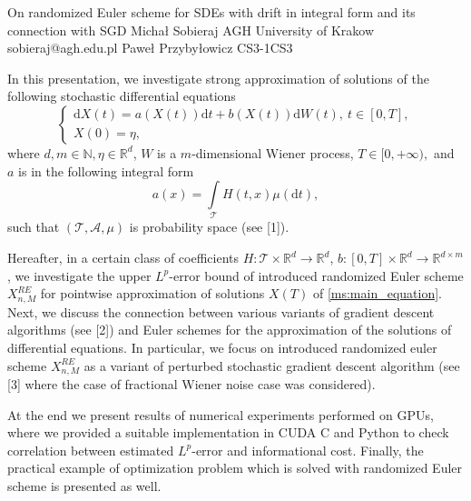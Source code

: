 \begin{talk}
  {On randomized Euler scheme for SDEs with drift in integral form and its connection with SGD}%
  {Micha{\l } Sobieraj}%
  {AGH University of Krakow}%
  {sobieraj@agh.edu.pl}%
  {Pawe{\l } Przyby{\l }owicz}%
{}{}{CS3-1}{CS3}

			
In this presentation, we investigate strong approximation of solutions of the following stochastic differential equations 
\begin{equation}
\label{ms:main_equation}
	\left\{ \begin{array}{ll}
	\displaystyle{
	\mathrm{d} X(t) = a(X(t))\mathrm{d} t + b(X(t)) \mathrm{d} W(t), \ t\in [0,T]},\\
	X(0)=\eta, 
	\end{array} \right.
\end{equation}
where $d,m \in \mathbb{N}, \eta\in\mathbb{R}^d$, $W$ is a $m$-dimensional Wiener process, $T \in [0, +\infty),$
and $a$ is in the following integral form
\begin{equation*}
    a(x)=\int\limits_{\mathcal{T}} H(t,x) \mu(\mathrm{d}t),
\end{equation*}
such that $(\mathcal{T}, \mathcal{A}, \mu)$ is probability space (see [1]). 

Hereafter, in a certain class of coefficients $H:\mathcal{T}\times\mathbb{R}^d\to\mathbb{R}^d$, $b:[0,T]\times\mathbb{R}^d\to \mathbb{R}^{d \times m}$, we investigate the upper $L^{p}$-error bound of introduced randomized Euler scheme $X^{RE}_{n, M}$ for pointwise approximation of solutions $X(T)$ of \eqref{ms:main_equation}. Next, we discuss the connection between various variants of gradient descent algorithms (see [2]) and Euler schemes for the approximation of the solutions of differential equations. In particular, we focus on introduced randomized euler scheme $X_{n, M}^{RE}$ as a variant of perturbed stochastic gradient descent algorithm (see [3] where the case of fractional Wiener noise case was considered).

At the end we present results of numerical experiments performed on
GPUs, where we provided a suitable implementation in CUDA C and Python to check correlation between estimated $L^p$-error and informational cost. Finally, the practical example of optimization problem which is solved with randomized Euler scheme is presented as well.
\medskip


\end{talk}
